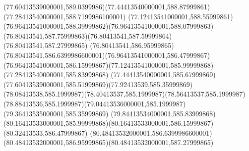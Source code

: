 {{	\curveto(77.60413539000001,589.0399986)(77.44413540000001,588.87999861)(77.28413540000001,588.7199986100001)
	\curveto(77.12413541000001,588.55999861)(76.96413541000001,588.39999862)(76.96413541000001,588.07999863)
	\curveto(76.80413541,587.75999863)(76.80413541,587.59999864)(76.80413541,587.27999865)
	\curveto(76.80413541,586.95999865)(76.80413541,586.6399986600001)(76.96413541000001,586.47999867)
	\curveto(76.96413541000001,586.15999867)(77.12413541000001,585.99999868)(77.28413540000001,585.83999868)
	\curveto(77.44413540000001,585.67999869)(77.60413539000001,585.51999869)(77.92413539,585.35999869)
	\curveto(78.08413538,585.1999987)(78.40413537,585.1999987)(78.56413537,585.1999987)
	\curveto(78.88413536,585.1999987)(79.04413536000001,585.1999987)(79.36413535000001,585.35999869)
	\lineto(79.84413534000001,585.83999868)
	\curveto(80.16413533000001,585.99999868)(80.16413533000001,586.15999867)(80.32413533,586.47999867)
	\curveto(80.48413532000001,586.6399986600001)(80.48413532000001,586.95999865)(80.48413532000001,587.27999865)
	\closepath
}
}
{
}
